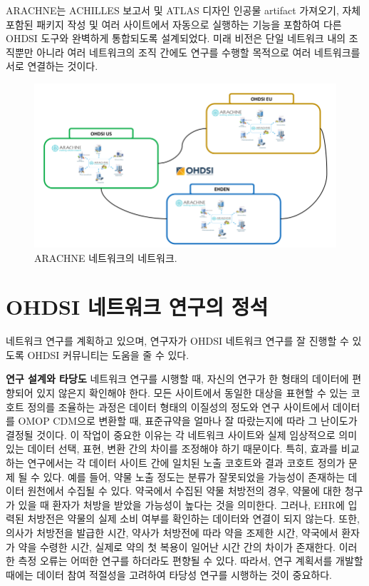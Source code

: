 \documentclass[10.5pt]{book}
\theoremstyle{definition}
\theoremstyle{definition}
\theoremstyle{definition}
\theoremstyle{remark}
\begin{document}
ARACHNE는 ACHILLES 보고서 및 ATLAS 디자인 인공물 artifact 가져오기, 자체
포함된 패키지 작성 및 여러 사이트에서 자동으로 실행하는 기능을 포함하여
다른 OHDSI 도구와 완벽하게 통합되도록 설계되었다. 미래 비전은 단일
네트워크 내의 조직뿐만 아니라 여러 네트워크의 조직 간에도 연구를 수행할
목적으로 여러 네트워크를 서로 연결하는 것이다.

\begin{figure}[h]

{\centering \includegraphics[width=0.9\linewidth]{images/NetworkStudies/ARACHNENON} 

}

\caption{ARACHNE 네트워크의 네트워크.}\label{fig:arachneNon}
\end{figure}

\section{OHDSI 네트워크 연구의 정석}\label{ohdsi---}


네트워크 연구를 계획하고 있으며, 연구자가 OHDSI 네트워크 연구를 잘
진행할 수 있도록 OHDSI 커뮤니티는 도움을 줄 수 있다.

\textbf{연구 설계와 타당도} 네트워크 연구를 시행할 때, 자신의 연구가 한
형태의 데이터에 편향되어 있지 않은지 확인해야 한다. 모든 사이트에서
동일한 대상을 표현할 수 있는 코호트 정의를 조율하는 과정은 데이터 형태의
이질성의 정도와 연구 사이트에서 데이터를 OMOP CDM으로 변환할 때,
표준규약을 얼마나 잘 따랐는지에 따라 그 난이도가 결정될 것이다. 이
작업이 중요한 이유는 각 네트워크 사이트와 실제 임상적으로 의미 있는
데이터 선택, 표현, 변환 간의 차이를 조정해야 하기 때문이다. 특히, 효과를
비교하는 연구에서는 각 데이터 사이트 간에 일치된 노출 코호트와 결과
코호트 정의가 문제 될 수 있다. 예를 들어, 약물 노출 정도는 분류가
잘못되었을 가능성이 존재하는 데이터 원천에서 수집될 수 있다. 약국에서
수집된 약물 처방전의 경우, 약물에 대한 청구가 있을 때 환자가 처방을
받았을 가능성이 높다는 것을 의미한다. 그러나, EHR에 입력된 처방전은
약물의 실제 소비 여부를 확인하는 데이터와 연결이 되지 않는다. 또한,
의사가 처방전을 발급한 시간, 약사가 처방전에 따라 약을 조제한 시간,
약국에서 환자가 약을 수령한 시간, 실제로 약의 첫 복용이 일어난 시간 간의
차이가 존재한다. 이러한 측정 오류는 어떠한 연구를 하더라도 편향될 수
있다. 따라서, 연구 계획서를 개발할 때에는 데이터 참여 적절성을 고려하여
타당성 연구를 시행하는 것이 중요하다.
\end{document}
